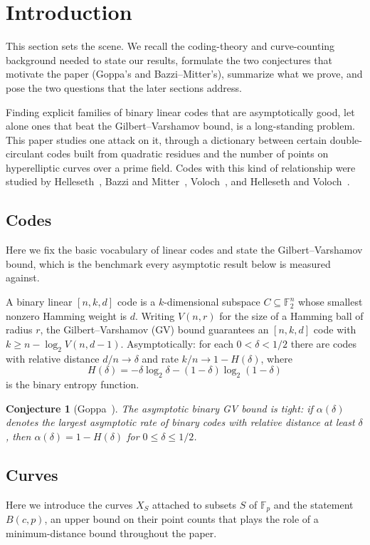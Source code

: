 \documentclass[12pt,letterpaper]{article}
\newtheorem{conjecture}[theorem]{Conjecture}
\theoremstyle{definition}
\theoremstyle{remark}
\numberwithin{equation}{section}
\newcommand{\F}{\mathbb{F}}
\newcommand{\Fp}{\mathbb{F}_p}
\begin{document}
\section{Introduction}
\label{sec:intro}

This section sets the scene. We recall the coding-theory and curve-counting
background needed to state our results, formulate the two conjectures that
motivate the paper (Goppa's and Bazzi--Mitter's), summarize what we prove, and
pose the two questions that the later sections address.

Finding explicit families of binary linear codes that are asymptotically good,
let alone ones that beat the Gilbert--Varshamov bound, is a long-standing problem.
This paper studies one attack on it, through a dictionary between certain
double-circulant codes built from quadratic residues and the number of points on
hyperelliptic curves over a prime field. Codes with this kind of relationship were
studied by Helleseth~\cite{He92}, Bazzi and Mitter~\cite{BM06}, Voloch~\cite{Vo04},
and Helleseth and Voloch~\cite{HV04}.

\subsection{Codes}
Here we fix the basic vocabulary of linear codes and state the Gilbert--Varshamov
bound, which is the benchmark every asymptotic result below is measured against.

A binary linear $[n,k,d]$ code is a $k$-dimensional subspace $C\subseteq\F_2^n$
whose smallest nonzero Hamming weight is $d$. Writing $V(n,r)$ for the size of a
Hamming ball of radius $r$, the Gilbert--Varshamov (GV) bound guarantees an
$[n,k,d]$ code with $k\ge n-\log_2 V(n,d-1)$. Asymptotically: for each
$0<\delta<1/2$ there are codes with relative distance $d/n\to\delta$ and rate
$k/n\to 1-H(\delta)$, where
\[
H(\delta)=-\delta\log_2\delta-(1-\delta)\log_2(1-\delta)
\]
is the binary entropy function.

\begin{conjecture}[Goppa~\cite{Go93}]\label{conj:goppa}
The asymptotic binary GV bound is tight: if $\alpha(\delta)$ denotes the largest
asymptotic rate of binary codes with relative distance at least $\delta$, then
$\alpha(\delta)=1-H(\delta)$ for $0\le\delta\le 1/2$.
\end{conjecture}

\subsection{Curves}
Here we introduce the curves $X_S$ attached to subsets $S$ of $\Fp$ and the
statement $B(c,p)$, an upper bound on their point counts that plays the role of a
minimum-distance bound throughout the paper.
\end{document}
